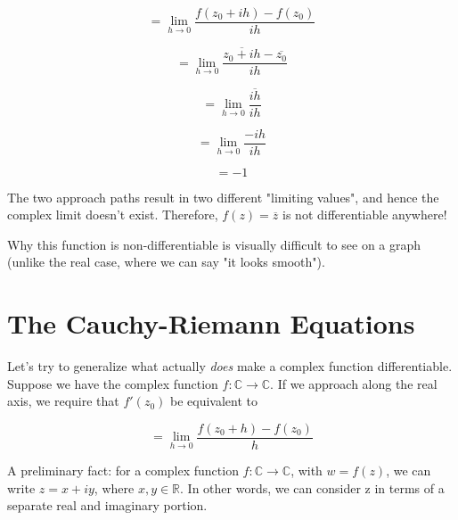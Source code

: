 \documentclass{article}
\newcommand*\conj[1]{\overline{#1}}
\begin{document}
\begin{itemize}
\begin{equation}
= \lim_{h \to 0}\frac{f(z_0 + ih)-f(z_0)}{ih}
\end{equation}

\begin{equation}
= \lim_{h \to 0}\frac{\conj{z_0 + ih}-\conj{z_0}}{ih}
\end{equation}

\begin{equation}
= \lim_{h \to 0}\frac{\conj{ih}}{ih}
\end{equation}

\begin{equation}
= \lim_{h \to 0}\frac{-ih}{ih}
\end{equation}

\begin{equation}
= -1
\end{equation}




\end{itemize}

The two approach paths result in two different "limiting values", and hence the complex limit doesn't exist. Therefore, $f(z) = \conj{z}$ is not differentiable anywhere!


Why this function is non-differentiable is visually difficult to see on a graph (unlike the real case, where we can say "it looks smooth"). 


\section{The Cauchy-Riemann Equations}

Let's try to generalize what actually \textit{does} make a complex function differentiable. Suppose we have the complex function $f: \mathbb{C} \rightarrow \mathbb{C}$. If we approach along the real axis, we require that $f'(z_0)$ be equivalent to


\begin{equation}
= \lim_{h \to 0}\frac{f(z_0 + h)-f(z_0)}{h}
\end{equation}





A preliminary fact: for a complex function $f: \mathbb{C} \rightarrow \mathbb{C}$, with $w = f(z)$, we can write $z = x + iy$, where $x, y \in \mathbb{R}$. In other words, we can consider z in terms of a separate real and imaginary portion. 
\end{document}
